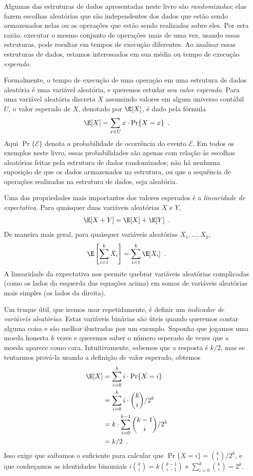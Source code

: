 %
%
%
%
Algumas das estruturas de dados apresentadas neste livro são \emph{randomizadas}; elas fazem 
escolhas aleatórias que são independentes dos dados que estão sendo armazenados nelas ou as 
operações que estão sendo realizadas sobre eles. Por esta razão, executar o mesmo conjunto 
de operações mais de uma vez, usando essas estruturas, pode resultar em tempos de execução 
diferentes. Ao analisar essas estruturas de dados, estamos interessados em sua média ou 
tempo de execução \emph{esperado}.
%
%

Formalmente, o tempo de execução de uma operação em uma estrutura de dados aleatória é uma variável aleatória, e queremos estudar seu \emph{valor esperado}. 
%
Para uma variável aleatória discreta $X$ assumindo valores em algum universo contábil $U$, 
o valor esperado de $X$, denotado por $\E[X]$, é dado pela fórmula
\[
\E[X] = \sum_{x\in U} x\cdot\Pr\{X=x\} \enspace .
\]
Aqui $\Pr\{\mathcal{E}\}$ denota a probabilidade de ocorrência do evento 
$\mathcal{E}$. Em todos os exemplos neste livro, essas probabilidades são apenas com relação às escolhas aleatórias feitas pela estrutura de dados randomizados; não há nenhuma suposição de que os dados armazenados na estrutura, ou que a sequência de operações realizadas na estrutura de dados, seja aleatória.

Uma das propriedades mais importantes dos valores esperados é a \emph{linearidade de 
	expectativa}.  
Para quaisquer duas variáveis aleatórias $X$ e $Y$,
\[
\E[X+Y] = \E[X] + \E[Y] \enspace .
\]
De maneira mais geral, para quaisquer variáveis aleatórias $X_1,\ldots,X_k$,
\[
\E\left[\sum_{i=1}^k X_i\right] = \sum_{i=1}^k \E[X_i] \enspace .
\]
A linearidade da expectativa nos permite quebrar variáveis aleatórias complicadas (como os 
lados da esquerda das equações acima) em somas de variáveis aleatórias mais simples (os lados da direita).

Um truque útil, que iremos usar repetidamente, é definir um \emph{indicador de variáveis aleatórias}.
%
Estas variáveis binárias são úteis quando queremos contar alguma coisa e são melhor 
ilustradas por um exemplo. Suponha que jogamos uma moeda honesta $k$ vezes e queremos 
saber o número esperado de vezes que a moeda aparece como cara.
%
Intuitivamente, sabemos que a resposta é $k/2$, mas se tentarmos prová-la usando a definição de valor esperado, obtemos
\begin{align*}
\E[X] & = \sum_{i=0}^k i\cdot\Pr\{X=i\} \\
& = \sum_{i=0}^k i\cdot\binom{k}{i}/2^k \\
& = k\cdot \sum_{i=0}^{k-1}\binom{k-1}{i}/2^k \\
& = k/2 \enspace .
\end{align*}
Isso exige que saibamos o suficiente para calcular que $\Pr\{X=i\}
= \binom{k}{i}/2^k$, e que conheçamos as identidades binomiais
$i\binom{k}{i}=k\binom{k-1}{i-1}$ e $\sum_{i=0}^{k} \binom{k}{i} = 2^{k}$.

